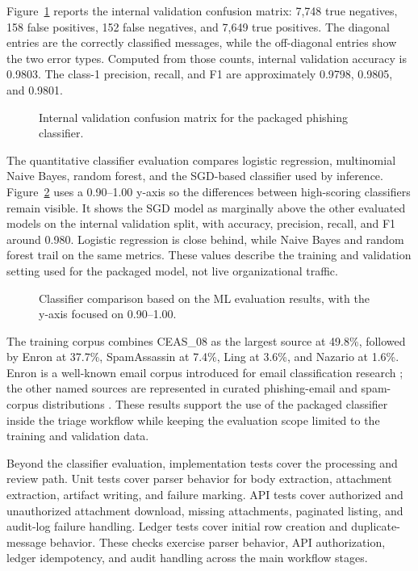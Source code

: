 \documentclass[12pt,a4paper]{article}
\begin{document}
Figure~\ref{fig:confusion-matrix} reports the internal validation confusion matrix: 7,748 true negatives, 158 false positives, 152 false negatives, and 7,649 true positives. The diagonal entries are the correctly classified messages, while the off-diagonal entries show the two error types. Computed from those counts, internal validation accuracy is 0.9803. The class-1 precision, recall, and F1 are approximately 0.9798, 0.9805, and 0.9801.

\begin{figure}[!htbp]
\centering

\caption{Internal validation confusion matrix for the packaged phishing classifier.}
\label{fig:confusion-matrix}
\end{figure}

The quantitative classifier evaluation compares logistic regression, multinomial Naive Bayes, random forest, and the SGD-based classifier used by inference. Figure~\ref{fig:ml-comparison} uses a 0.90--1.00 y-axis so the differences between high-scoring classifiers remain visible. It shows the SGD model as marginally above the other evaluated models on the internal validation split, with accuracy, precision, recall, and F1 around 0.980. Logistic regression is close behind, while Naive Bayes and random forest trail on the same metrics. These values describe the training and validation setting used for the packaged model, not live organizational traffic.

\begin{figure}[!htbp]
\centering
\resizebox{0.9\textwidth}{!}{}
\caption{Classifier comparison based on the ML evaluation results, with the y-axis focused on 0.90--1.00.}
\label{fig:ml-comparison}
\end{figure}

The training corpus combines CEAS\_08 as the largest source at 49.8\%, followed by Enron at 37.7\%, SpamAssassin at 7.4\%, Ling at 3.6\%, and Nazario at 1.6\%. Enron is a well-known email corpus introduced for email classification research \cite{klimt2004enron}; the other named sources are represented in curated phishing-email and spam-corpus distributions \cite{champa2024curated,spamassassin_corpus,fraudulent_email_corpus}. These results support the use of the packaged classifier inside the triage workflow while keeping the evaluation scope limited to the training and validation data.

Beyond the classifier evaluation, implementation tests cover the processing and review path. Unit tests cover parser behavior for body extraction, attachment extraction, artifact writing, and failure marking. API tests cover authorized and unauthorized attachment download, missing attachments, paginated listing, and audit-log failure handling. Ledger tests cover initial row creation and duplicate-message behavior. These checks exercise parser behavior, API authorization, ledger idempotency, and audit handling across the main workflow stages.
\end{document}
